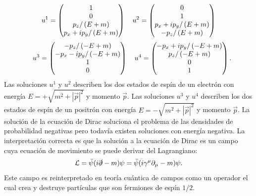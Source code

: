 \documentclass{article}
\theoremstyle{plain}
\theoremstyle{definition}
\begin{document}
	\[
	u^1 =
	\left(\begin{array}{@{}c@{}}
	1 \\
	0 \\
	p_z/\left(E+m\right) \\
	p_x+ip_y/\left(E+m\right)
	\end{array} \right)
	\quad
	u^2 =
	\left(\begin{array}{@{}c@{}}
	0 \\
	1 \\
	p_x+ip_y/\left(E+m\right) \\
	-p_z/\left(E+m\right)
	\end{array} \right)
	\]
	\[
	\quad
	u^3 = 
	\left(\begin{array}{@{}c@{}}
	-p_z/\left(-E+m\right) \\
	-p_x-ip_y/\left(-E+m\right)\\
	1 \\
	0
	\end{array} \right)
	\quad
	u^4 =
	\left(\begin{array}{@{}c@{}}
	-p_x+ip_y/\left(-E+m\right) \\
	p_z/\left(-E+m\right)\\
	0 \\
	1
	\end{array} \right)\text{.}
	\]
	Las soluciones \(u^1\) y \(u^2\) describen los dos estados de espín de un electrón con energía \(E=+\sqrt{m^2+|\vec{p}|^2}\) y momento \(\vec{p} \). Las soluciones \(u^3\) y \(u^4\) describen los dos estados de espín de un positrón con energía \(E=-\sqrt{m^2+|\vec{p}|^2}\) y momento \(\vec{p} \). La solución de la ecuación de Dirac soluciona el problema de las densidades de probabilidad negativas pero todavía existen soluciones con energía negativa. La interpretación correcta es que la solución a la ecuación de Dirac es un campo cuya ecuación de movimiento se puede derivar del Lagrangiano: \begin{dmath}\label{DiracFieldLagrangian}
		\mathcal{L}=\bar{\psi}(i\slashed{\partial}-m)\psi = \bar{\psi}(i\gamma^{\mu}\partial_{\mu}-m)\psi\text{.}
	\end{dmath}
	Este campo es reinterpretado en teoría cuántica de campos como un operador  el cual crea y destruye partículas que son fermiones de espín \(1/2\).
\end{document}
